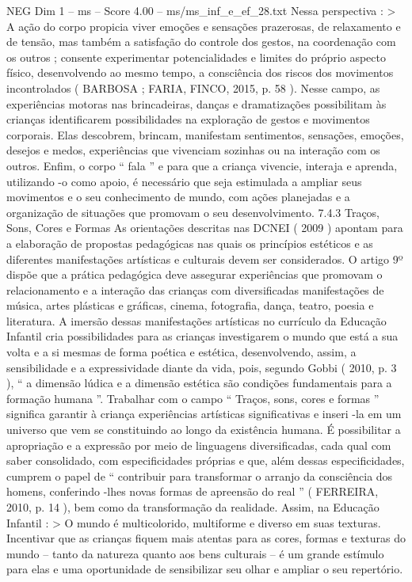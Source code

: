 \begin{textsample}{NEG Dim 1 – ms – Score 4.00 – ms/ms\_inf\_e\_ef\_28.txt}
Nessa perspectiva : > A ação do corpo propicia viver emoções e sensações prazerosas, de relaxamento e de tensão, mas também a satisfação do controle dos gestos, na coordenação com os outros ; consente experimentar potencialidades e limites do próprio aspecto físico, desenvolvendo ao mesmo tempo, a consciência dos riscos dos movimentos incontrolados ( BARBOSA ; FARIA, FINCO, 2015, p. 58 ).
Nesse campo, as experiências motoras nas brincadeiras, danças e dramatizações possibilitam às crianças identificarem possibilidades na exploração de gestos e movimentos corporais.
Elas descobrem, brincam, manifestam sentimentos, sensações, emoções, desejos e medos, experiências que vivenciam sozinhas ou na interação com os outros.
Enfim, o corpo “ fala ” e para que a criança vivencie, interaja e aprenda, utilizando -o como apoio, é necessário que seja estimulada a ampliar seus movimentos e o seu conhecimento de mundo, com ações planejadas e a organização de situações que promovam o seu desenvolvimento. 7.4.3 Traços, Sons, Cores e Formas As orientações descritas nas DCNEI ( 2009 ) apontam para a elaboração de propostas pedagógicas nas quais os princípios estéticos e as diferentes manifestações artísticas e culturais devem ser considerados.
O artigo 9º dispõe que a prática pedagógica deve assegurar experiências que promovam o relacionamento e a interação das crianças com diversificadas manifestações de música, artes plásticas e gráficas, cinema, fotografia, dança, teatro, poesia e literatura.
A imersão dessas manifestações artísticas no currículo da Educação Infantil cria possibilidades para as crianças investigarem o mundo que está a sua volta e a si mesmas de forma poética e estética, desenvolvendo, assim, a sensibilidade e a expressividade diante da vida, pois, segundo Gobbi ( 2010, p. 3 ), “ a dimensão lúdica e a dimensão estética são condições fundamentais para a formação humana ”.
Trabalhar com o campo “ Traços, sons, cores e formas ” significa garantir à criança experiências artísticas significativas e inseri -la em um universo que vem se constituindo ao longo da existência humana.
É possibilitar a apropriação e a expressão por meio de linguagens diversificadas, cada qual com saber consolidado, com especificidades próprias e que, além dessas especificidades, cumprem o papel de “ contribuir para transformar o arranjo da consciência dos homens, conferindo -lhes novas formas de apreensão do real ” ( FERREIRA, 2010, p. 14 ), bem como da transformação da realidade.
Assim, na Educação Infantil : > O mundo é multicolorido, multiforme e diverso em suas texturas.
Incentivar que as crianças fiquem mais atentas para as cores, formas e texturas do mundo – tanto da natureza quanto aos bens culturais – é um grande estímulo para elas e uma oportunidade de sensibilizar seu olhar e ampliar o seu repertório.

\end{textsample}
